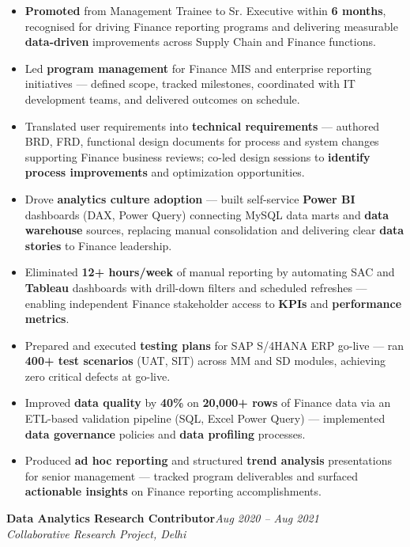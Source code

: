 \documentclass[10pt, letterpaper]{article}
\newcommand{\role}[3]{%
  \vspace{2pt}%
  {\bfseries #1}\hfill{\small\color{muted}\textit{#3}}\\[-2pt]%
  {\small\color{muted}\textit{#2}}%
}
\begin{document}
\begin{itemize}
  \item \textbf{Promoted} from Management Trainee to Sr. Executive within \textbf{6 months}, recognised for driving Finance reporting programs and delivering measurable \textbf{data-driven} improvements across Supply Chain and Finance functions.
  \item Led \textbf{program management} for Finance MIS and enterprise reporting initiatives — defined scope, tracked milestones, coordinated with IT development teams, and delivered outcomes on schedule.
  \item Translated user requirements into \textbf{technical requirements} — authored BRD, FRD, functional design documents for process and system changes supporting Finance business reviews; co-led design sessions to \textbf{identify process improvements} and optimization opportunities.
  \item Drove \textbf{analytics culture adoption} — built self-service \textbf{Power BI} dashboards (DAX, Power Query) connecting MySQL data marts and \textbf{data warehouse} sources, replacing manual consolidation and delivering clear \textbf{data stories} to Finance leadership.
  \item Eliminated \textbf{12+ hours/week} of manual reporting by automating SAC and \textbf{Tableau} dashboards with drill-down filters and scheduled refreshes — enabling independent Finance stakeholder access to \textbf{KPIs} and \textbf{performance metrics}.
  \item Prepared and executed \textbf{testing plans} for SAP S/4HANA ERP go-live — ran \textbf{400+ test scenarios} (UAT, SIT) across MM and SD modules, achieving zero critical defects at go-live.
  \item Improved \textbf{data quality} by \textbf{40\%} on \textbf{20,000+ rows} of Finance data via an ETL-based validation pipeline (SQL, Excel Power Query) — implemented \textbf{data governance} policies and \textbf{data profiling} processes.
  \item Produced \textbf{ad hoc reporting} and structured \textbf{trend analysis} presentations for senior management — tracked program deliverables and surfaced \textbf{actionable insights} on Finance reporting accomplishments.
\end{itemize}

\vspace{1pt}

\role{Data Analytics Research Contributor}{Collaborative Research Project, Delhi}{Aug 2020 – Aug 2021}
\end{document}

